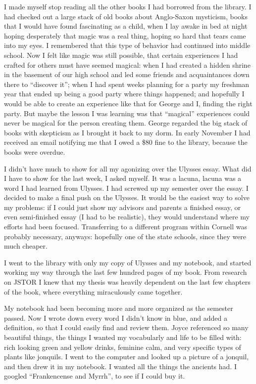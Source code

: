 I made myself stop reading all the other books I had borrowed from the library.
I had checked out a large stack of old books about Anglo-Saxon mysticism, books
that I would have found fascinating as a child, when I lay awake in bed at night
hoping desperately that magic was a real thing, hoping so hard that tears came
into my eyes.  I remembered that this type of behavior had continued into middle
school.  Now I felt like magic was still possible, that certain experiences I
had crafted for others must have seemed magical: when I had created a hidden
shrine in the basement of our high school and led some friends and acquaintances
down there to ``discover it''; when I had spent weeks planning for a party my
freshman year that ended up being a good party where things happened; and
hopefully I would be able to create an experience like that for George and I,
finding the right party.  But maybe the lesson I was learning was that
``magical'' experiences could never be magical for the person creating them.
George regarded the big stack of books with skepticism as I brought it back to
my dorm.  In early November I had received an email notifying me that I owed a
\$80 fine to the library, because the books were overdue.

I didn't have much to show for all my agonizing over the Ulysses essay.  What
did I have to show for the last week, I asked myself.  It was a lacuna, lacuna
was a word I had learned from Ulysses. I had screwed up my semester over the
essay.  I decided to make a final push on the Ulysses.  It would be the easiest
way to solve my problems: if I could just show my advisors and parents a
finished essay, or even semi-finished essay (I had to be realistic), they would
understand where my efforts had been focused.  Transferring to a different
program within Cornell was probably necessary, anyways: hopefully one of the
state schools, since they were much cheaper.

I went to the library with only my copy of Ulysses and my notebook, and started
working my way through the last few hundred pages of my book.  From research on
JSTOR I knew that my thesis was heavily dependent on the last few chapters of
the book, where everything miraculously came together.

My notebook had been becoming more and more organized as the semester passed.
Now I wrote down every word I didn't know in blue, and added a definition, so
that I could easily find and review them.  Joyce referenced so many beautiful
things, the things I wanted my vocabularly and life to be filled with: rich
looking green and yellow drinks, feminine calm, and very specific types of
plants like jonquils.  I went to the computer and looked up a picture of a
jonquil, and then drew it in my notebook.  I wanted all the things the ancients
had.  I googled ``Frankencense and Myrrh'', to see if I could buy it.


